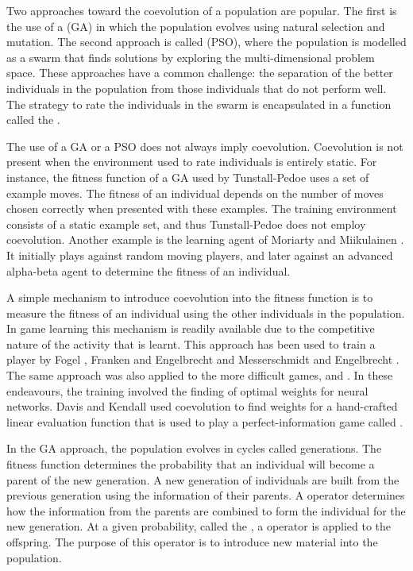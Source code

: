 Two approaches toward the coevolution of a population are popular.  The first is the use of a  (GA) in which the population evolves using natural selection and mutation.  The second approach is called  (PSO), where the population is modelled as a swarm that finds solutions by exploring the multi-dimensional problem space.  These approaches have a common challenge: the separation of the better individuals in the population from those individuals that do not perform well.  The strategy to rate the individuals in the swarm is encapsulated in a function called the .  

The use of a GA or a PSO does not always imply coevolution. Coevolution is not present when the environment used to rate  individuals is entirely static.  For instance,  the fitness function of a GA used by Tunstall-Pedoe \cite{tunstall-pedoe:genetic} uses a set of example moves.  The fitness of an individual depends on the number of moves chosen correctly when presented with these examples.  The training environment consists of a static example set, and thus Tunstall-Pedoe does not employ coevolution. Another example is the  learning agent of Moriarty and Miikulainen \cite{moriarty:evolving}. It initially plays against random moving players, and later against an advanced alpha-beta agent to determine the fitness of an individual.       

A simple mechanism to introduce coevolution into the fitness function is to measure the fitness of an individual using the other individuals in the population.  In game learning this mechanism is readily available due to the competitive nature of the activity that is learnt. This approach has been used to train a  player by Fogel \cite{fogel:networks},  Franken and Engelbrecht \cite{franken:evolving} and Messerschmidt and Engelbrecht \cite{messerschmidt:learning}. The same approach was also applied to the more difficult games,  \cite{franken:checkers,chellapilla:without,fogel:edge}  and  \cite{fogel:chess}.  In these endeavours, the training involved the finding of optimal weights for neural networks. Davis and Kendall \cite{davis:evolve} used coevolution to find weights for a hand-crafted linear evaluation function that is used to play a perfect-information game called .

In the GA approach, the population evolves in cycles called generations.  The fitness function determines the probability that an individual will become a parent of the new generation.  A new generation of individuals are built from the previous generation using the information of their parents.  A  operator determines how the information from the parents are combined to form the individual for the new generation.  At a given probability, called the ,  a  operator is applied to the offspring.  The purpose of this operator is to introduce new material into the population.

